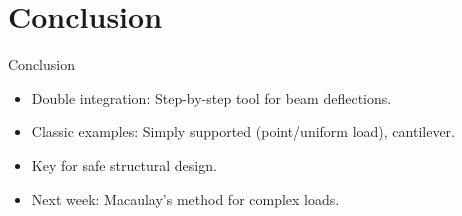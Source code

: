 \documentclass{beamer}
\begin{document}
\section{Conclusion}
\begin{frame}{Conclusion}
    \begin{itemize}
        \item Double integration: Step-by-step tool for beam deflections.
        \item Classic examples: Simply supported (point/uniform load), cantilever.
        \item Key for safe structural design.
        \item Next week: Macaulay’s method for complex loads.
    \end{itemize}
\end{frame}
\end{document}
